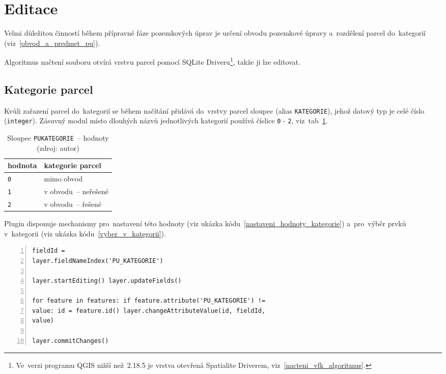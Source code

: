\newpage

\section{Editace}
\label{editace}

Velmi důležitou činností během přípravné fáze pozemkových úprav je
určení obvodu pozemkové úpravy a~rozdělení parcel do~kategorií
(viz~\ref{obvod_a_predmet_pu}).

Algoritmus načtení  souboru otvírá vrstvu parcel pomocí SQLite
Driveru\footnote{Ve~verzi programu QGIS nižší než~2.18.5 je vrstva
otevřená Spatialite Driverem, viz~\ref{nacteni_vfk_algoritmus}.},
takže ji lze editovat.

\subsection{Kategorie parcel}
\label{kategorie_parcel}

Kvůli zařazení parcel do~kategorií se během načítání přidává do~vrstvy
parcel sloupec \texttt{} (alias
\texttt{KATEGORIE}), jehož datový typ je celé číslo
(\texttt{integer}). Zásuvný modul místo dlouhých názvů jednotlivých
kategorií používá číslice \texttt{0} - \texttt{2},
viz~tab~\ref{tab:kategorie_hodnoty}.

\begin{table}[H]
    \begin{tabular}{|l|l|} \hline hodnota & kategorie parcel \\ \hline
\hline \texttt{0} & mimo obvod \\ \hline \texttt{1} & v obvodu~–
neřešené \\ \hline \texttt{2} & v obvodu~– řešené \\ \hline
    \end{tabular} \centering
    \caption[Sloupec \texttt{PU\textunderscore KATEGORIE}~–
hodnoty]{Sloupec \texttt{PU\textunderscore KATEGORIE}~– hodnoty (zdroj: autor)}
    \label{tab:kategorie_hodnoty}
\end{table}

Plugin disponuje mechanismy pro~nastavení této hodnoty (viz ukázka
kódu~\ref{nastaveni_hodnoty_kategorie}) a~pro~výběr prvků v~kategorii
(viz ukázka kódu~\ref{vyber_v_kategorii}).

{\scriptsize
\begin{lstlisting}[style=python, caption={Kategorie parcel~– nastavení
hodnoty}, captionpos=b, label=nastaveni_hodnoty_kategorie,
backgroundcolor = \color{light-gray}, numbers=left] fieldId =
layer.fieldNameIndex('PU_KATEGORIE')

layer.startEditing() layer.updateFields()

for feature in features: if feature.attribute('PU_KATEGORIE') !=
value: id = feature.id() layer.changeAttributeValue(id, fieldId,
value)

layer.commitChanges()
\end{lstlisting}}

